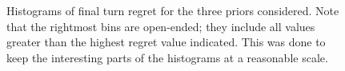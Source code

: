 \begin{figure}

    \caption[
        Histograms of final turn regret.
    ]
    {
        Histograms of final turn regret for the three priors considered.
        Note that the rightmost bins are open-ended; they include all values greater than the highest regret value indicated.
        This was done to keep the interesting parts of the histograms at a reasonable scale.
    }
    \label{fig:histograms_random}
\end{figure}
